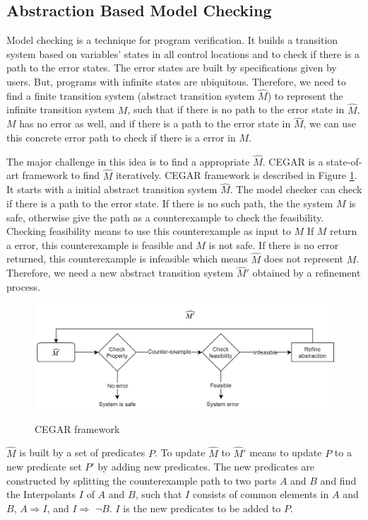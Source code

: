 \documentclass{article}
\begin{document}
\subsection{Abstraction Based Model Checking}
Model checking is a technique for program verification. It builds a transition system based on variables' states in all control locations and to check if there is a path to the error states. The error states are built by specifications given by users. But, programs with infinite states are ubiquitous. Therefore, we need to find a finite transition system (abstract transition system $\widehat{M}$) to represent the infinite transition system $M$, such that if there is no path to the error state in $\widehat{M}$, $M$ has no error as well, and if there is a path to the error state in $\widehat{M}$, we can use this concrete error path to check if there is a error in $M$.

The major challenge in this idea is to find a appropriate $\widehat{M}$. CEGAR \cite{10.1007/10722167_15} is a state-of-art framework to find $\widehat{M}$ iteratively. CEGAR framework is described in Figure \ref{CEGAR}. It starts with a initial abstract transition system $\widehat{M}$. The model checker can check if there is a path to the error state. If there is no such path, the the system $M$ is safe, otherwise give the path as a counterexample to check the feasibility. Checking feasibility means to use this counterexample as input to $M$ If $M$ return a error, this counterexample is feasible and $M$ is not safe. If there is no error returned, this counterexample is infeasible which means $\widehat{M}$ does not represent $M$. Therefore, we need a new abstract transition system $\widehat{M}'$ obtained by a refinement process.

\begin{figure}[h]
\centering
  \includegraphics[width=12cm]{graph/CEGAR}\\
  \caption{CEGAR framework}\label{CEGAR}
\end{figure}


$\widehat{M}$ is built by a set of predicates $P$. To update $\widehat{M}$ to $\widehat{M}'$ means to update $P$ to a new predicate set $P'$ by adding new predicates. The new predicates are constructed by splitting the counterexample path to two parts $A$ and $B$ and find the Interpolants $I$ of $A$ and $B$, such that $I$ consists of common elements in $A$ and $B$, $A\Rightarrow I$, and $I\Rightarrow$ $\neg B$. $I$ is the new predicates to be added to $P$.
\end{document}
